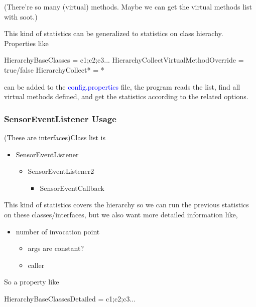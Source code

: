 \documentclass{article}
\begin{document}
(There're so many (virtual) methods. Maybe we can 
get the virtual methods list with soot.)
\par{
This kind of statistics can be generalized to 
statistics on class hierachy.
Properties like
\begin{verbatime}
HierarchyBaseClasses = c1;c2;c3...
HierarchyCollectVirtualMethodOverride = true/false
HierarchyCollect* = *
\end{verbatime}
can be added to the \textcolor{blue}{config.properties} file, 
the program reads the list, find all virtual methods defined,
and get the statistics according to the related options.
}
\subsubsection{SensorEventListener Usage}
(These are interfaces)Class list is 
\begin{itemize}
	\item SensorEventListener
		\begin{itemize}
			\item SensorEventListener2
				\begin{itemize}
					\item SensorEventCallback
				\end{itemize}
		\end{itemize}
\end{itemize}
This kind of statistics covers the hierarchy so 
we can run the previous statistics on these 
classes/interfaces,
but we also want more detailed information like,
\begin{itemize}
	\item number of invocation point
	 	\begin{itemize}
	 		\item args are constant?
	 		\item caller
	 	\end{itemize}
\end{itemize}
So a property like
\begin{verbatime}
HierarchyBaseClassesDetailed = c1;c2;c3...
\end{verbatime}
\end{document}
